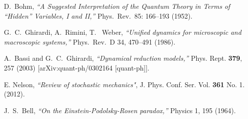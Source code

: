 \documentclass[12pt]{article}
\begin{document}
\begin{thebibliography}{99}
\small{



 D.~Bohm, {\sl ``A Suggested Interpretation of the Quantum Theory in Terms of “Hidden”
Variables, I and II,''} Phys.\ Rev.\ 85: 166–193 (1952).

 G.~C.~Ghirardi, A.~Rimini, T.~ Weber, {\sl ``Unified dynamics for microscopic and
macroscopic systems,''} Phys.\ Rev.\ D 34, 470–491 (1986).

A.~Bassi and G.~C.~Ghirardi,
{\sl ``Dynamical reduction models,''}
Phys. Rept. \textbf{379}, 257 (2003)
[arXiv:quant-ph/0302164 [quant-ph]].


 E. Nelson, {\sl ``Review of stochastic mechanics"}, J. Phys. Conf. Ser. Vol. {\bf 361} No. 1. (2012).

 J.~S.~Bell, {\sl ``On the Einstein-Podolsky-Rosen paradox,''} Physics 1, 195 (1964).

 



  







}
\end{thebibliography}
\end{document}
